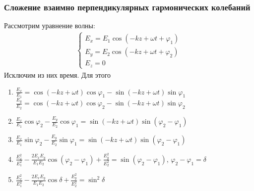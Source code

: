\documentclass[10pt,pdf,hyperref={unicode}, dvipsnames, handout]{beamer}
\begin{document}
	
\begin{frame}
	\frametitle{Сложение взаимно перпендикулярных гармонических колебаний}
Рассмотрим уравнение волны: 
\begin{gather*} 
\begin{cases} 
E_x = E_1\cos\left(-kz+\omega t+\varphi_1\right) \\ 
E_y = E_2\cos\left(-kz+\omega t+\varphi_2\right) \\ 
E_z = 0 
\end{cases} 
\end{gather*} 
Исключим из них время. Для этого 
\begin{enumerate} 
\item %
$\frac{E_x}{E_1}=\cos(-{k}{z}+\omega t)\cos\varphi_1-\sin(-kz+\omega t)\sin\varphi_1$\\ %
$\frac{E_y}{E_2}=\cos(-kz+\omega t)\cos\varphi_2-\sin(-kz+\omega t)\sin\varphi_2$ %
\item %
$\frac{E_x}{E_1}\cos\varphi_2-\frac{E_y}{E_2}\cos\varphi_1=\sin(-kz+\omega t)\sin(\varphi_2-\varphi_1)$ 
\item %
$\frac{E_x}{E_1}\sin\varphi_2-\frac{E_y}{E_2}\sin\varphi_1=\sin(-kz+\omega t)\sin(\varphi_2-\varphi_1)$ 
\item %
$\frac{E_x^2}{E_1^2}-\frac{2E_xE_y}{E_1E_2}\cos(\varphi_2-\varphi_1)+\frac{E_y^2}{E_2^2}=\sin(\varphi_2-\varphi_1)$, 
$\varphi_2-\varphi_1=\delta$ 
\item $\frac{E_x^2}{E_1^2}-\frac{2E_xE_y}{E_1E_2}\cos\delta+\frac{E_y^2}{E_2^2}=\sin^2\delta$ 
\end{enumerate} 

\end{frame}

\end{document}
